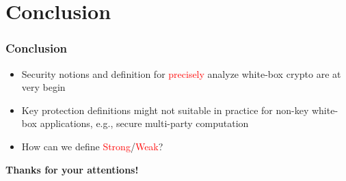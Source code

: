 \documentclass{beamer}
\begin{document}
\section{Conclusion}

\frame
{
\frametitle{Conclusion}

\begin{itemize}
\setlength{\itemsep}{12pt}
\item Security notions and definition for \textcolor{red}{precisely} analyze white-box crypto are at very begin

\item Key protection definitions might not suitable in practice for non-key white-box applications, e.g., secure multi-party computation

\item How can we define \textcolor{red}{Strong}/\textcolor{red}{Weak}?
\end{itemize}

}

\frame
{
\begin{center}
\textbf{Thanks for your attentions!}
\end{center}
\begin{center}

\end{center}
}
\end{document}
